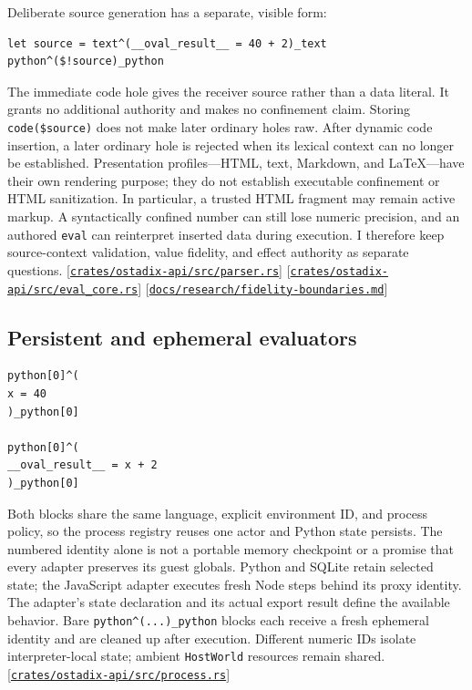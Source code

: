 \documentclass[11pt,oneside]{article}
\newcommand{\src}[1]{\textcolor{OSlate}{\scriptsize[\href{https://github.com/lostadi/OSTADIX/blob/c0b02c326b2329a95ba52447c7180bc93957cd57/#1}{\nolinkurl{#1}}]}\allowbreak}
\begin{document}
Deliberate source generation has a separate, visible form:

\begin{lstlisting}[style=ostyle]
let source = text^(__oval_result__ = 40 + 2)_text
python^($!source)_python
\end{lstlisting}

The immediate code hole gives the receiver source rather than a data literal.
It grants no additional authority and makes no confinement claim. Storing
\texttt{code(\$source)} does not make later ordinary holes raw. After dynamic
code insertion, a later ordinary hole is rejected when its lexical context
can no longer be established. Presentation profiles---HTML, text, Markdown,
and LaTeX---have their own rendering purpose; they do not establish executable
confinement or HTML sanitization. In particular, a trusted HTML fragment may
remain active markup. A syntactically confined number can still lose numeric
precision, and an authored \texttt{eval} can reinterpret inserted data during
execution. I therefore keep source-context validation, value fidelity, and
effect authority as separate questions.
\src{crates/ostadix-api/src/parser.rs}
\src{crates/ostadix-api/src/eval_core.rs}
\src{docs/research/fidelity-boundaries.md}

\subsection{Persistent and ephemeral evaluators}

\begin{lstlisting}[style=ostyle]
python[0]^(
x = 40
)_python[0]

python[0]^(
__oval_result__ = x + 2
)_python[0]
\end{lstlisting}

Both blocks share the same language, explicit environment ID, and process
policy, so the process registry reuses one actor and Python state persists.
The numbered identity alone is not a portable memory checkpoint or a promise
that every adapter preserves its guest globals. Python and SQLite retain
selected state; the JavaScript adapter executes fresh Node steps behind its
proxy identity. The adapter's state declaration and its actual export result
define the available behavior.
Bare \texttt{python\string^(...\string)\_python} blocks each receive a fresh
ephemeral identity and are cleaned up after execution. Different numeric IDs
isolate interpreter-local state; ambient \texttt{HostWorld} resources remain
shared. \src{crates/ostadix-api/src/process.rs}
\end{document}
